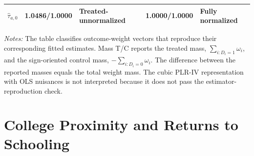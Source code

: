 \documentclass[12pt, a4paper, oneside]{article}
\theoremstyle{plain}
\theoremstyle{definition}
\begin{document}
\begin{table}[htbp]
\begin{threeparttable}
\begin{tabular}{@{}lclcl@{}}
$\widehat{\tau}_{a,0}$
& 1.0486/1.0000 & Treated-unnormalized
& 1.0000/1.0000 & Fully normalized \\

\bottomrule
\end{tabular}

\begin{tablenotes}
\footnotesize
\item \textit{Notes:} The table classifies outcome-weight vectors that
reproduce their corresponding fitted estimates. Mass T/C reports the treated
mass, \(\sum_{i:D_i=1}\omega_i\), and the sign-oriented control mass,
\(-\sum_{i:D_i=0}\omega_i\). The difference between the reported masses equals the
total weight mass. The cubic PLR-IV representation with OLS nuisances is not
interpreted because it does not pass the estimator-reproduction check.
\end{tablenotes}
\end{threeparttable}
\end{table}





\section{College Proximity and Returns to Schooling}
\label{sec:card}
\end{document}
